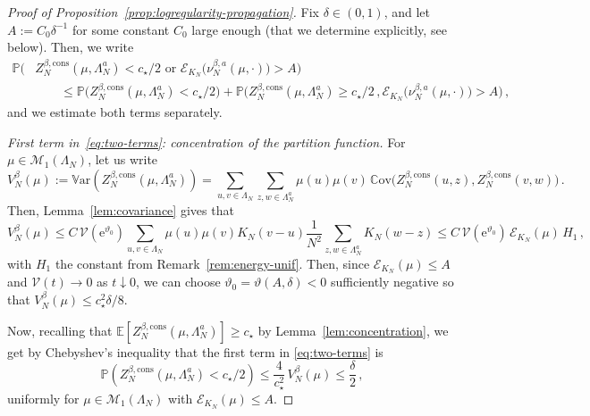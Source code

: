 \documentclass[11pt]{amsart}
\numberwithin{equation}{section}
\newcommand{\e}{\mathrm{e}}
\newcommand*{\cons}{\mathrm{cons}}
\newcommand*{\Var}{\mathbb{V}\mathrm{ar}}
\newcommand*{\Cov}{\mathbb{C}\mathrm{ov}}
\theoremstyle{plain}
\theoremstyle{definition}
\theoremstyle{remark}
\newcommand{\blue}{\color{blue}}
\begin{document}
\begin{proof}[Proof of Proposition~\ref{prop:logregularity-propagation}]
Fix $\delta \in (0,1)$, and let \(A:=C_0 \delta^{-1}\) for some constant \(C_0\) large enough (that we determine explicitly, see below).
Then, we write 
\begin{equation}
       \label{eq:two-terms}
       \begin{split}
       \mathbb{P}\Big(&Z_N^{\beta,\cons}(\mu,\Lambda_N^a)< c_\star/2  \text{ or } \mathcal{E}_{K_N}\big(\nu_N^{\beta,a}(\mu,\cdot) \big) > A \Big)  \\
       &\qquad \leq \mathbb{P}\big(Z_N^{\beta,\cons}(\mu,\Lambda_N^a)< c_\star/2\big) + \mathbb{P}\big(Z_N^{\beta,\cons}(\mu,\Lambda_N^a)\geq c_\star/2 \,, \mathcal{E}_{K_N}\big(\nu_N^{\beta,a}(\mu,\cdot) \big) > A \big) \,,    
\end{split}
\end{equation}
and we estimate both terms separately.

\smallskip
\noindent
\textit{First term in~\eqref{eq:two-terms}: concentration of the partition function.}
For \(\mu\in \mathcal{M}_1(\Lambda_N)\), let us write
$$
V_N^{\beta}(\mu) := \Var\left(Z_N^{\beta,\cons}(\mu,\Lambda_N^a)\right)
= \sum_{u,v\in\Lambda_N} \sum_{z,w\in\Lambda_N^a} \mu(u)\mu(v) \, \Cov\bigl(Z_N^{\beta,\cons}(u,z),Z_N^{\beta,\cons}(v,w)\bigr) \,.
$$
Then, Lemma~\ref{lem:covariance} gives that 
\[
V_N^{\beta}(\mu) 
\le C \,\mathcal{V}(\e^{\vartheta_0}) 
\sum_{u,v\in\Lambda_N}\mu(u)\mu(v)K_N(v-u)
\frac{1}{ N^2}  \sum_{z,w\in\Lambda_N^a}K_N(w-z) \le
C \,\mathcal{V}(\e^{\vartheta_0})\, \mathcal{E}_{K_N}(\mu) \,H_1 \,,
\]
with \(H_1\) the constant from Remark~\ref{rem:energy-unif}.
Then, since \(\mathcal{E}_{K_N}(\mu) \leq A\) and \(\mathcal{V}(t) \to 0\) as \(t\downarrow0\), we can choose \(\vartheta_0 = \vartheta(A,\delta)<0\) sufficiently negative so that \(V_N^{\beta}(\mu) \leq  c_{\star}^2 \delta /8\).

Now, recalling that \(\mathbb{E}[Z_N^{\beta,\cons}(\mu,\Lambda_N^a)] \geq c_{\star}\) by Lemma~\ref{lem:concentration}, we get by Chebyshev's inequality that the first term in \eqref{eq:two-terms} is 
\[
       \mathbb{P}\left(Z_N^{\beta,\cons}(\mu,\Lambda_N^a)<c_\star/2\right) \leq \frac{4}{c_\star^2}\, V_N^{\beta}(\mu) \le \frac{\delta}{2} \,,
\]
uniformly for \(\mu\in \mathcal{M}_1(\Lambda_N)\) with \(\mathcal{E}_{K_N}(\mu) \leq A\).



\end{proof}
\end{document}
